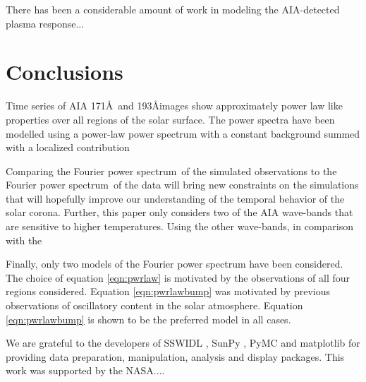 \documentclass[preprint2]{aastex}
\newcommand{\PS}{power spectrum}
\newcommand{\Fps}{Fourier \PS}
\begin{document}
There has been a considerable amount of work in modeling the
AIA-detected plasma response...  \cite{} 



\section{Conclusions}\label{sec:conc}

Time series of AIA 171\AA\ and 193\AA images show approximately power
law like properties over all regions of the solar surface.  The power
spectra have been modelled using a power-law power spectrum with a
constant background summed with a localized contribution 

Comparing the \Fps\ of the simulated observations to the \Fps\ of the
data will bring new constraints on the simulations that will hopefully
improve our understanding of the temporal behavior of the solar
corona.  Further, this paper only considers two of the AIA wave-bands
that are sensitive to higher temperatures.  Using the other
wave-bands, in comparison with the

Finally, only two models of the Fourier power spectrum have been
considered.  The choice of equation \ref{eqn:pwrlaw} is motivated by
the observations of all four regions considered.  Equation
\ref{eqn:pwrlawbump} was motivated by previous observations of
oscillatory content in the solar atmosphere.  Equation
\ref{eqn:pwrlawbump} is shown to be the preferred model in all cases.








\acknowledgments

We are grateful to the developers of SSWIDL \cite{}, SunPy \cite{},
PyMC \cite{} and matplotlib \cite{} for providing data preparation,
manipulation, analysis and display packages.  This work was supported
by the NASA....

\end{document}
